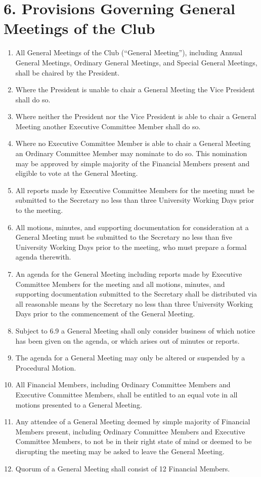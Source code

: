 \documentclass[12pt]{article}
\begin{document}
\section{6. Provisions Governing General Meetings of the Club}
\begin{enumerate}[label=6.\arabic*]
\item All General Meetings of the Club (“General Meeting”), including Annual General Meetings, Ordinary General Meetings, and Special General Meetings, shall be chaired by the President.
\item Where the President is unable to chair a General Meeting the Vice President shall do so.
\item Where neither the President nor the Vice President is able to chair a General Meeting another Executive Committee Member shall do so.
\item Where no Executive Committee Member is able to chair a General Meeting an Ordinary Committee Member may nominate to do so. This nomination may be approved by simple majority of the Financial Members present and eligible to vote at the General Meeting.
\item All reports made by Executive Committee Members for the meeting must be submitted to the Secretary no less than three University Working Days prior to the meeting.
\item All motions, minutes, and supporting documentation for consideration at a General Meeting must be submitted to the Secretary no less than five University Working Days prior to the meeting, who must prepare a formal agenda therewith.
\item An agenda for the General Meeting including reports made by Executive Committee Members for the meeting and all motions, minutes, and supporting documentation submitted to the Secretary shall be distributed via all reasonable means by the Secretary no less than three University Working Days prior to the commencement of the General Meeting.
\item Subject to 6.9 a General Meeting shall only consider business of which notice has been given on the agenda, or which arises out of minutes or reports.
\item The agenda for a General Meeting may only be altered or suspended by a Procedural Motion.
\item All Financial Members, including Ordinary Committee Members and Executive Committee Members, shall be entitled to an equal vote in all motions presented to a General Meeting.
\item Any attendee of a General Meeting deemed by simple majority of Financial Members present, including Ordinary Committee Members and Executive Committee Members, to not be in their right state of mind or deemed to be disrupting the meeting may be asked to leave the General Meeting.
\item Quorum of a General Meeting shall consist of 12 Financial Members.
\end{enumerate}
\end{document}
